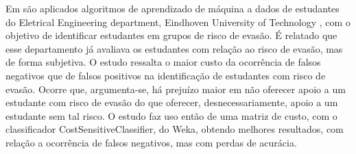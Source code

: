 Em \cite{EDM_pred_dropout} são aplicados algoritmos de aprendizado de máquina a dados de estudantes do Eletrical Engineering department, Eindhoven University of Technology , com o objetivo de identificar estudantes em grupos de risco de evasão. É relatado que esse departamento já avaliava os estudantes com relação ao risco de evasão, mas de forma subjetiva. O estudo ressalta o maior custo da ocorrência de falsos negativos que de falsos positivos na identificação de estudantes com risco de evasão. Ocorre que, argumenta-se, há prejuízo maior em não oferecer apoio a um estudante com risco de evasão do que oferecer, desnecessariamente, apoio a um estudante sem tal risco. O estudo faz uso então de uma matriz de custo, com o classificador CostSensitiveClassifier, do Weka, obtendo melhores resultados, com relação a ocorrência de falsos negativos, mas com perdas de acurácia. 

\cite{EDM_review_and_soa} 
\cite{EDM_retention} 
\cite{EDM_education}
\cite{EDM_dropout_rates}
\cite{EDM_ufrj}
\cite{EDM_ufrj2}
\cite{EDM_brasil}